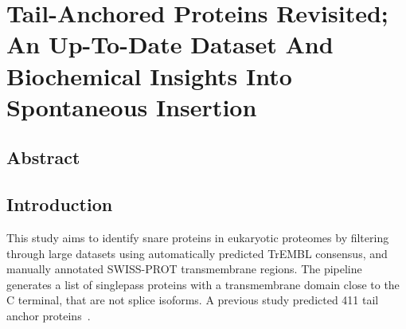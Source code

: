 \chapter{Tail-Anchored Proteins Revisited; An Up-To-Date Dataset And Biochemical Insights Into Spontaneous Insertion}
\section{Abstract}

\section{Introduction}
This study aims to identify \gls{snare} proteins in eukaryotic proteomes by filtering through large datasets using automatically predicted TrEMBL consensus, and manually annotated SWISS-PROT transmembrane regions. The pipeline generates a list of singlepass proteins with a transmembrane domain close to the C terminal, that are not splice isoforms. A previous study predicted 411 tail anchor proteins~\cite{Kalbfleisch2007}.

